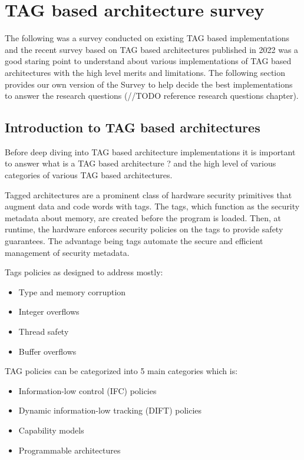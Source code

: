 



\section[TAG based architecture survey]{TAG based architecture survey}   
The following was a survey conducted on existing TAG based implementations and the 
recent survey based on TAG based architectures \cite{acmTAGSurvey} published
in 2022 was a good staring point to understand about various implementations of TAG
based architectures with the high level merits and limitations. The following section 
provides our own version of the Survey to help decide the best implementations 
to answer the research questions (//TODO reference research questions chapter).

\subsection{Introduction to TAG based architectures}

Before deep diving into TAG based architecture implementations it is important to 
answer what is a TAG based architecture ? and the high level of various 
categories of various TAG based architectures.

Tagged architectures are a prominent class of hardware security primitives that augment data and code words
with tags. The tags, which function as the security metadata
about memory, are created before the program is loaded. 
Then, at runtime, the hardware enforces security policies on the tags to provide safety guarantees. 
The advantage being tags automate the secure and efficient management of security metadata. 

Tags policies as designed to address mostly:
\begin{itemize}
  \item Type and memory corruption
  \item Integer overflows
  \item Thread safety
  \item Buffer overflows
\end{itemize}

TAG policies can be categorized into 5 main categories which is:
\begin{itemize}
  \item Information-low control (IFC) policies
  \item Dynamic information-low tracking (DIFT) policies
  \item Capability models
  \item Programmable architectures
\end{itemize}


